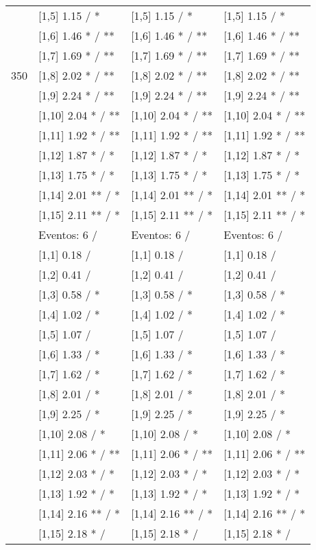 \begin{table}
\begin{tabular}[t]{llll}
 & {}[1,5] 1.15  / * & {}[1,5] 1.15  / * & {}[1,5] 1.15  / *\\
 & {}[1,6] 1.46 * / ** & {}[1,6] 1.46 * / ** & {}[1,6] 1.46 * / **\\
 & {}[1,7] 1.69 * / ** & {}[1,7] 1.69 * / ** & {}[1,7] 1.69 * / **\\
350 & {}[1,8] 2.02 * / ** & {}[1,8] 2.02 * / ** & {}[1,8] 2.02 * / **\\
\addlinespace
 & {}[1,9] 2.24 * / ** & {}[1,9] 2.24 * / ** & {}[1,9] 2.24 * / **\\
 & {}[1,10] 2.04 * / ** & {}[1,10] 2.04 * / ** & {}[1,10] 2.04 * / **\\
 & {}[1,11] 1.92 * / ** & {}[1,11] 1.92 * / ** & {}[1,11] 1.92 * / **\\
 & {}[1,12] 1.87 * / * & {}[1,12] 1.87 * / * & {}[1,12] 1.87 * / *\\
 & {}[1,13] 1.75 * / * & {}[1,13] 1.75 * / * & {}[1,13] 1.75 * / *\\
\addlinespace
 & {}[1,14] 2.01 ** / * & {}[1,14] 2.01 ** / * & {}[1,14] 2.01 ** / *\\
 & {}[1,15] 2.11 ** / * & {}[1,15] 2.11 ** / * & {}[1,15] 2.11 ** / *\\
 & Eventos:  6 / & Eventos:  6 / & Eventos:  6 /\\
 & {}[1,1] 0.18  / & {}[1,1] 0.18  / & {}[1,1] 0.18  /\\
 & {}[1,2] 0.41  / & {}[1,2] 0.41  / & {}[1,2] 0.41  /\\
\addlinespace
 & {}[1,3] 0.58  / * & {}[1,3] 0.58  / * & {}[1,3] 0.58  / *\\
 & {}[1,4] 1.02  / * & {}[1,4] 1.02  / * & {}[1,4] 1.02  / *\\
 & {}[1,5] 1.07  / & {}[1,5] 1.07  / & {}[1,5] 1.07  /\\
 & {}[1,6] 1.33  / * & {}[1,6] 1.33  / * & {}[1,6] 1.33  / *\\
 & {}[1,7] 1.62  / * & {}[1,7] 1.62  / * & {}[1,7] 1.62  / *\\
\addlinespace
500 & {}[1,8] 2.01  / * & {}[1,8] 2.01  / * & {}[1,8] 2.01  / *\\
 & {}[1,9] 2.25  / * & {}[1,9] 2.25  / * & {}[1,9] 2.25  / *\\
 & {}[1,10] 2.08  / * & {}[1,10] 2.08  / * & {}[1,10] 2.08  / *\\
 & {}[1,11] 2.06 * / ** & {}[1,11] 2.06 * / ** & {}[1,11] 2.06 * / **\\
 & {}[1,12] 2.03 * / * & {}[1,12] 2.03 * / * & {}[1,12] 2.03 * / *\\
\addlinespace
 & {}[1,13] 1.92 * / * & {}[1,13] 1.92 * / * & {}[1,13] 1.92 * / *\\
 & {}[1,14] 2.16 ** / * & {}[1,14] 2.16 ** / * & {}[1,14] 2.16 ** / *\\
 & {}[1,15] 2.18 * / & {}[1,15] 2.18 * / & {}[1,15] 2.18 * /\\
\bottomrule
\end{tabular}
\end{table}
